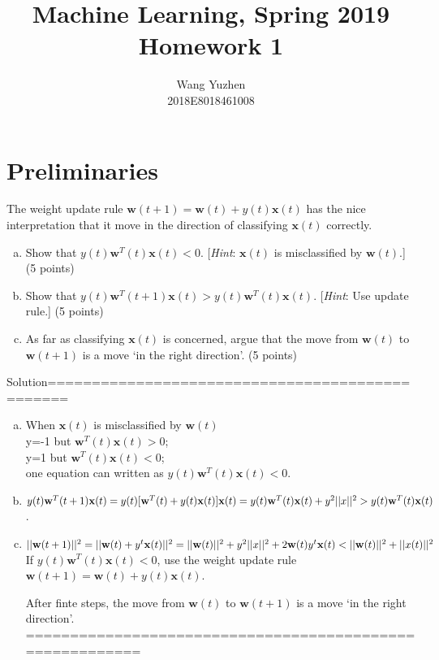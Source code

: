 \documentclass[11pt, a4paper]{article}
\begin{document}
\title{\textbf{Machine Learning, Spring 2019}\\Homework 1}
\date{Wang Yuzhen\\2018E8018461008}
\author{}
\maketitle

\section{Preliminaries}
The weight update rule $\mathbf{w}(t+1)=\mathbf{w}(t) + y(t)\mathbf{x}(t)$ has the nice interpretation that it move in the direction of classifying $\mathbf{x}(t) $ correctly.
\begin{enumerate}[(a)]
\item Show that $y(t)\mathbf{w}^T(t)\mathbf{x}(t)<0$. [\textit{Hint}: $\mathbf{x}(t)$ is misclassified by $\mathbf{w}(t)$.] (5 points)


\item Show that $y(t)\mathbf{w}^T(t+1)\mathbf{x}(t)>y(t)\mathbf{w}^T(t)\mathbf{x}(t)$. [\textit{Hint}: Use update rule.] (5 points)

\item As far as classifying $\mathbf{x}(t)$ is concerned, argue that the move from $\mathbf{w}(t)$ to $\mathbf{w}(t+1)$ is a move `in the right direction'. (5 points)

\end{enumerate}
Solution================================================
\begin{enumerate}[(a)]
	\item 
    When
	$\mathbf{x}(t)$ is misclassified by $\mathbf{w}(t)$\\
	y=-1 but  $\mathbf{w}^T(t)\mathbf{x}(t)>0$;\\
	y=1 but  $\mathbf{w}^T(t)\mathbf{x}(t)<0$;\\
    one equation can written as $y(t)\mathbf{w}^T(t)\mathbf{x}(t)<0$.
	
	\item $y(t)\mathbf{w}^T(t+1)\mathbf{x}(t)\\=y(t) [\mathbf{w}^T(t)+y(t)\mathbf{x}(t)]  \mathbf{x}(t)\\
		=y(t)\mathbf{w}^T(t)\mathbf{x}(t) +y^{2}||x ||^{2}\\
		>y(t)\mathbf{w}^T(t)\mathbf{x}(t)$. 
	
	\item $||\mathbf{w}(t+1)|| ^{2}\\
	=||\mathbf{w}(t)+ y^{t} \mathbf{x}(t)||^{2}\\
	= ||\mathbf{w}(t)||^{2} +y^{2}||x ||^{2} + 2\mathbf{w}(t) y^{t} \mathbf{x}(t)\\
	<||\mathbf{w}(t)||^{2}+||x(t)||^{2}
	$\\
	If $y(t)\mathbf{w}^T(t)\mathbf{x}(t)<0$,
	use the weight update rule $\mathbf{w}(t+1)=\mathbf{w}(t) + y(t)\mathbf{x}(t)$.
	 
	After finte steps, the move from $\mathbf{w}(t)$ to $\mathbf{w}(t+1)$ is a move `in the right direction'.\\
=========================================================
	\end{enumerate}
\end{document}
